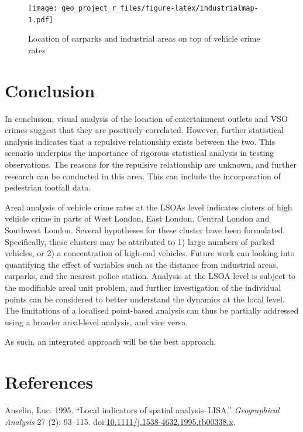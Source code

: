 \documentclass[]{article}
\theoremstyle{definition}
\theoremstyle{definition}
\theoremstyle{definition}
\theoremstyle{remark}
\begin{document}
\begin{figure}
\centering
\texttt{[image: geo\_project\_r\_files/figure-latex/industrialmap-1.pdf]}
\caption{\label{fig:industrialmap}Location of carparks and industrial areas
on top of vehicle crime rates}
\end{figure}

\pagebreak

\section{Conclusion}\label{conclusion}

In conclusion, visual analysis of the location of entertainment outlets
and VSO crimes suggest that they are positively correlated. However,
further statistical analysis indicates that a repulsive relationship
exists between the two. This scenario underpins the importance of
rigorous statistical analysis in testing observations. The reasons for
the repulsive relationship are unknown, and further research can be
conducted in this area. This can include the incorporation of pedestrian
footfall data.

Areal analysis of vehicle crime rates at the LSOAs level indicates
cluters of high vehicle crime in parts of West London, East London,
Central London and Southwest London. Several hypotheses for these
cluster have been formulated. Specifically, these clusters may be
attributed to 1) large numbers of parked vehicles, or 2) a concentration
of high-end vehicles. Future work can looking into quantifying the
effect of variables such as the distance from industrial areas,
carparks, and the nearest police station. Analysis at the LSOA level is
subject to the modifiable areal unit problem, and further investigation
of the individual points can be considered to better understand the
dynamics at the local level. The limitations of a localised point-based
analysis can thus be partially addressed using a broader areal-level
analysis, and vice versa.

As such, an integrated approach will be the best approach.

\pagebreak

\section{References}\label{references}

\hypertarget{refs}{}
\hypertarget{ref-Anselin1995}{}
Anselin, Luc. 1995. ``Local indicators of spatial analysis--LISA.''
\emph{Geographical Analysis} 27 (2): 93--115.
doi:\href{https://doi.org/10.1111/j.1538-4632.1995.tb00338.x}{10.1111/j.1538-4632.1995.tb00338.x}.
\end{document}
